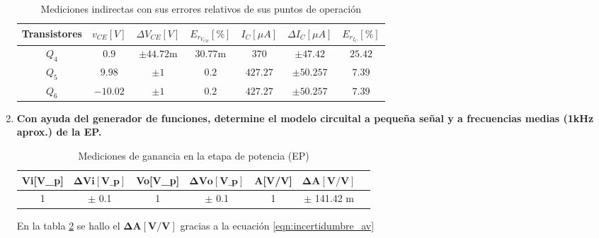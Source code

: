 \begin{enumerate}
        \begin{table}[H]
          \centering
          \begin{tabular}{|c|c|c|c|c|c|c|}
            \hline
            \textbf{Transistores} & $v_{CE} [V]$ & $\Delta V_{CE} [V]$  & $E_{r_{V_{CE}}} [\%]$ & $I_{C} [\mu A]$ & $\Delta I_{C} [\mu A]$ & $E_{r_{I_{C}}} [\%]$ \\
            \hline
            $Q_4$                 & $0.9$        & $\pm 44.72 \text{m}$ & $30.77 \text{m}$      & $370$           & $\pm 47.42$            & $25.42$              \\
            \hline
            $Q_5$                 & $9.98$       & $\pm 1$              & $0.2$                 & $427.27$        & $\pm 50.257$           & $7.39$               \\
            \hline
            $Q_6$                 & $-10.02$     & $\pm 1$              & $0.2$                 & $427.27$        & $\pm 50.257$           & $7.39$               \\
            \hline
          \end{tabular}
          \caption{Mediciones indirectas con sus errores relativos de sus puntos de operación }
          \label{tab:puntos_operacion_experimental_maserror}
        \end{table}


  \item \textbf{Con ayuda del generador de funciones, determine el modelo circuital a pequeña señal y a frecuencias medias (1kHz aprox.) de la EP.}

        \begin{table}[H]
          \centering
          \begin{tabular}{|c|c|c|c|c|c|c|}
            \hline
            \textbf{Vi[V\_p]} & $\mathbf{\Delta Vi[V\_p]}$ & \textbf{Vo[V\_p]} & $\mathbf{\Delta Vo[V\_p]}$ & \textbf{A[V/V]} & $\mathbf{\Delta A[V/V]}$ \\
            \hline
            1                 & $\pm$ 0.1                  & 1                 & $\pm$ 0.1                  & 1               & $\pm$ 141.42 m           \\
            \hline
          \end{tabular}
          \caption{Mediciones de ganancia en la etapa de potencia (EP)}
          \label{tab:ganancia_ep}
        \end{table}

        En la tabla \ref{tab:ganancia_ep} se hallo el $\mathbf{\Delta A[V/V]}$ gracias a la ecuación \ref{eqn:incertidumbre_av}


\end{enumerate}
